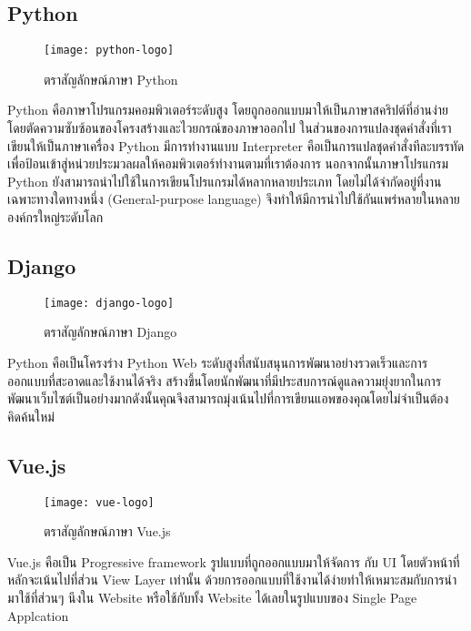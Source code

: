     \newpage
    \subsection{Python}
        \begin{figure}[H]
            \centering
            \texttt{[image: python-logo]}
            \caption{ตราสัญลักษณ์ภาษา Python}\label{python-logo}
        \end{figure}
        Python คือภาษาโปรแกรมคอมพิวเตอร์ระดับสูง โดยถูกออกแบบมาให้เป็นภาษาสคริปต์ที่อ่านง่าย  โดยตัดความซับซ้อนของโครงสร้างและไวยกรณ์ของภาษาออกไป ในส่วนของการแปลงชุดคำสั่งที่เราเขียนให้เป็นภาษาเครื่อง Python มีการทำงานแบบ Interpreter คือเป็นการแปลชุดคำสั่งทีละบรรทัด เพื่อป้อนเข้าสู่หน่วยประมวลผลให้คอมพิวเตอร์ทำงานตามที่เราต้องการ นอกจากนั้นภาษาโปรแกรม Python ยังสามารถนำไปใช้ในการเขียนโปรแกรมได้หลากหลายประเภท โดยไม่ได้จำกัดอยู่ที่งานเฉพาะทางใดทางหนึ่ง (General-purpose language) จึงทำให้มีการนำไปใช้กันแพร่หลายในหลายองค์กรใหญ่ระดับโลก

    \subsection{Django}
        \begin{figure}[H]
            \centering
            \texttt{[image: django-logo]}
            \caption{ตราสัญลักษณ์ภาษา Django}\label{django-logo}
        \end{figure}
        Python คือเป็นโครงร่าง Python Web ระดับสูงที่สนับสนุนการพัฒนาอย่างรวดเร็วและการออกแบบที่สะอาดและใช้งานได้จริง สร้างขึ้นโดยนักพัฒนาที่มีประสบการณ์ดูแลความยุ่งยากในการพัฒนาเว็บไซต์เป็นอย่างมากดังนั้นคุณจึงสามารถมุ่งเน้นไปที่การเขียนแอพของคุณโดยไม่จำเป็นต้องคิดค้นใหม่

    \subsection{Vue.js}
        \begin{figure}[H]
            \centering
            \texttt{[image: vue-logo]}
            \caption{ตราสัญลักษณ์ภาษา Vue.js}\label{vue-logo}
        \end{figure}
        Vue.js คือเป็น Progressive framework รูปแบบที่ถูกออกแบบมาให้จัดการ กับ UI โดยตัวหน้าที่หลักจะเน้นไปที่ส่วน View Layer เท่านั้น ด้วยการออกแบบที่ใช้งานได้ง่ายทำให้เหมาะสมกับการนำมาใช้ที่ส่วนๆ นึงใน Website หรือใช้กับทั้ง Website ได้เลยในรูปแบบของ Single Page Applcation 

